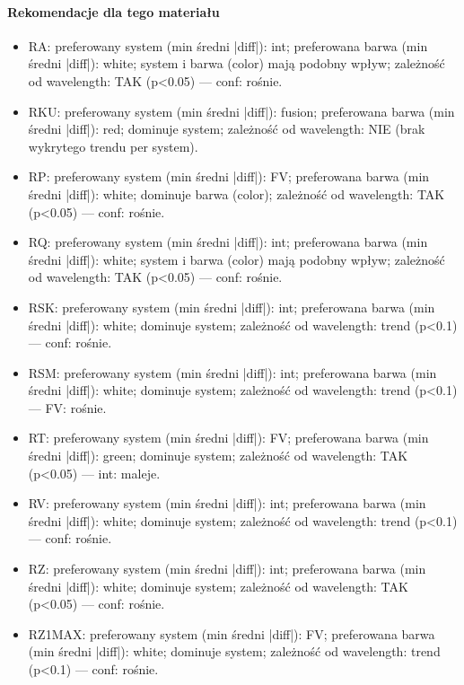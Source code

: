 \documentclass[
  10pt,
]{article}
\begin{document}
\paragraph{Rekomendacje dla tego materiału}
\begin{itemize}
\item RA: preferowany system (min średni |diff|): int; preferowana barwa (min średni |diff|): white; system i barwa (color) mają podobny wpływ; zależność od wavelength: TAK (p<0.05) — conf: rośnie.
\item RKU: preferowany system (min średni |diff|): fusion; preferowana barwa (min średni |diff|): red; dominuje system; zależność od wavelength: NIE (brak wykrytego trendu per system).
\item RP: preferowany system (min średni |diff|): FV; preferowana barwa (min średni |diff|): white; dominuje barwa (color); zależność od wavelength: TAK (p<0.05) — conf: rośnie.
\item RQ: preferowany system (min średni |diff|): int; preferowana barwa (min średni |diff|): white; system i barwa (color) mają podobny wpływ; zależność od wavelength: TAK (p<0.05) — conf: rośnie.
\item RSK: preferowany system (min średni |diff|): int; preferowana barwa (min średni |diff|): white; dominuje system; zależność od wavelength: trend (p<0.1) — conf: rośnie.
\item RSM: preferowany system (min średni |diff|): int; preferowana barwa (min średni |diff|): white; dominuje system; zależność od wavelength: trend (p<0.1) — FV: rośnie.
\item RT: preferowany system (min średni |diff|): FV; preferowana barwa (min średni |diff|): green; dominuje system; zależność od wavelength: TAK (p<0.05) — int: maleje.
\item RV: preferowany system (min średni |diff|): int; preferowana barwa (min średni |diff|): white; dominuje system; zależność od wavelength: trend (p<0.1) — conf: rośnie.
\item RZ: preferowany system (min średni |diff|): int; preferowana barwa (min średni |diff|): white; dominuje system; zależność od wavelength: TAK (p<0.05) — conf: rośnie.
\item RZ1MAX: preferowany system (min średni |diff|): FV; preferowana barwa (min średni |diff|): white; dominuje system; zależność od wavelength: trend (p<0.1) — conf: rośnie.
\end{itemize}
\end{document}
